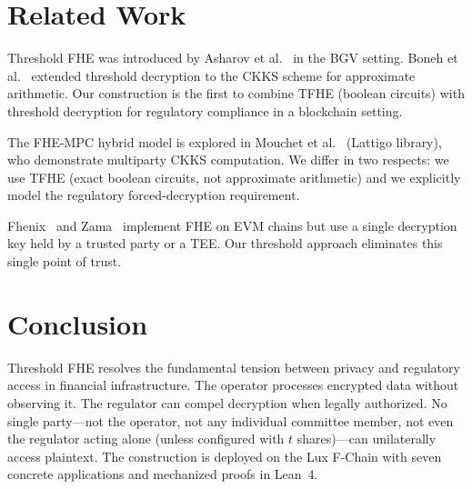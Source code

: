 \documentclass[11pt,a4paper]{article}
\begin{document}
\section{Related Work}
\label{sec:related}

Threshold FHE was introduced by Asharov et al.~\cite{asharov2012}
in the BGV setting.  Boneh et al.~\cite{boneh2018} extended threshold
decryption to the CKKS scheme for approximate arithmetic.  Our
construction is the first to combine TFHE (boolean circuits) with
threshold decryption for regulatory compliance in a blockchain
setting.

The FHE-MPC hybrid model is explored in Mouchet et
al.~\cite{mouchet2021} (Lattigo library), who demonstrate multiparty
CKKS computation.  We differ in two respects: we use TFHE (exact
boolean circuits, not approximate arithmetic) and we explicitly model
the regulatory forced-decryption requirement.

Fhenix~\cite{fhenix2024} and Zama~\cite{zama2024} implement FHE on
EVM chains but use a single decryption key held by a trusted party
or a TEE.  Our threshold approach eliminates this single point of trust.

\section{Conclusion}
\label{sec:conclusion}

Threshold FHE resolves the fundamental tension between privacy and
regulatory access in financial infrastructure.  The operator processes
encrypted data without observing it.  The regulator can compel
decryption when legally authorized.  No single party---not the operator,
not any individual committee member, not even the regulator acting
alone (unless configured with $t$ shares)---can unilaterally access
plaintext.  The construction is deployed on the Lux F-Chain with
seven concrete applications and mechanized proofs in Lean~4.
\end{document}
